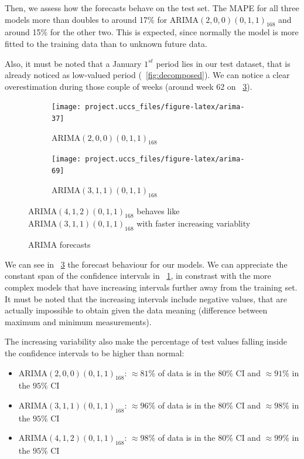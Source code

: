 \documentclass[12pt]{article}
\begin{document}
Then, we assess how the forecasts behave on the test set. The MAPE for all three models more than doubles to around 17\% for $\mathrm{ARIMA}(2,0,0)(0,1,1)_{168}$ and around 15\% for the other two. This is expected, since normally the model is more fitted to the training data than to unknown future data.

Also, it must be noted that a January $1^{st}$ period lies in our test dataset, that is already noticed as low-valued period (\figurename~\ref{fig:decomposed}). We can notice a clear overestimation during those couple of weeks (around week 62 on \figurename~\ref{fig:arima-forecast}).

\begin{figure}[h]
	\begin{subfigure}{.5\linewidth}
		\texttt{[image: project.uccs\_files/figure-latex/arima-37]}
		\caption{$\mathrm{ARIMA}(2,0,0)(0,1,1)_{168}$}
		\label{fig:arima-forecast:200011}
	\end{subfigure}
	\begin{subfigure}{.5\linewidth}
		\texttt{[image: project.uccs\_files/figure-latex/arima-69]}
		\caption{$\mathrm{ARIMA}(3,1,1)(0,1,1)_{168}$}
		\label{fig:arima-forecast:412011}
	\end{subfigure}
	\caption{ARIMA forecasts}{\footnotesize$\mathrm{ARIMA}(4,1,2)(0,1,1)_{168}$ behaves like $\mathrm{ARIMA}(3,1,1)(0,1,1)_{168}$ with faster increasing variablity}
	\label{fig:arima-forecast}
\end{figure}
%
We can see in \figurename~\ref{fig:arima-forecast} the forecast behaviour for our models. We can appreciate the constant span of the confidence intervals in \figurename~\ref{fig:arima-forecast:200011}, in constrast with the more complex models that have increasing intervals further away from the training set. It must be noted that the increasing intervals include negative values, that are actually impossible to obtain given the data meaning (difference between maximum and minimum measurements).

The increasing variability also make the percentage of test values falling inside the confidence intervals to be higher than normal:
\begin{itemize}[topsep=0.5em,itemsep=0em,partopsep=0.5em]
	\item $\mathrm{ARIMA}(2,0,0)(0,1,1)_{168}$: $\approx81\%$ of data is in the $80\%$ CI and $\approx91\%$ in the $95\%$ CI
	\item $\mathrm{ARIMA}(3,1,1)(0,1,1)_{168}$: $\approx96\%$ of data is in the $80\%$ CI and $\approx98\%$ in the $95\%$ CI
	\item $\mathrm{ARIMA}(4,1,2)(0,1,1)_{168}$: $\approx98\%$ of data is in the $80\%$ CI and $\approx99\%$ in the $95\%$ CI
\end{itemize}
\end{document}
